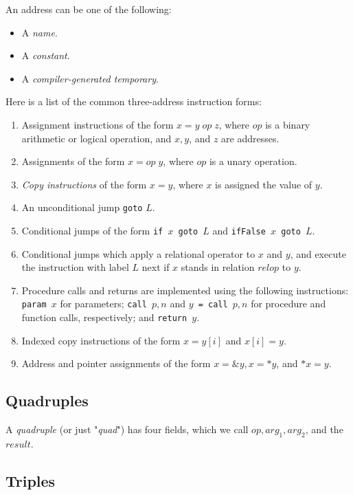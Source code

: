 \documentclass[12pt,a4paper,twoside,openany]{book}
\begin{document}
An address can be one of the following:
\begin{itemize}
    \item A \textit{name}.
    \item A \textit{constant}.
    \item A \textit{compiler-generated temporary}.
\end{itemize}

Here is a list of the common three-address instruction forms:
\begin{enumerate}
    \item Assignment instructions of the form $x=y\;op\;z$, where $op$ is a binary arithmetic or logical operation, and $x,y$, and $z$ are addresses.
    \item Assignments of the form $x=op\;y$, where $op$ is a unary operation.
    \item \textit{Copy instructions} of the form $x=y$, where $x$ is assigned the value of $y$.
    \item An unconditional jump \texttt{goto} $L$.
    \item Conditional jumps of the form \texttt{if $x$ goto $L$} and \texttt{ifFalse $x$ goto $L$}.
    \item Conditional jumps which apply a relational operator to $x$ and $y$, and execute the instruction with label $L$ next if $x$ stands in relation $relop$ to $y$.
    \item Procedure calls and returns are implemented using the following instructions: \texttt{param $x$} for parameters; \texttt{call $p,n$} and \texttt{$y$ = call $p,n$} for procedure and function calls, respectively; and \texttt{return $y$}.
    \item Indexed copy instructions of the form $x=y[i]$ and $x[i]=y$.
    \item Address and pointer assignments of the form $x=\&y,x=*y$, and $*x=y$.
\end{enumerate}

\subsection{Quadruples}

A \textit{quadruple} (or just "\textit{quad}") has four fields, which we call $op,arg_1,arg_2$, and the $result$.

\subsection{Triples}
\end{document}
